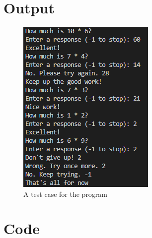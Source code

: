 \documentclass{article}
\begin{document}
\begin{flushleft}
  \section{Output}
  \begin{figure}[!h]
    \begin{centering}
      \includegraphics[scale=1]{P5_output.png}
      \caption{A test case for the program}
    \end{centering}
  \end{figure}
  \section{Code}
  
\end{flushleft}
\end{document}
